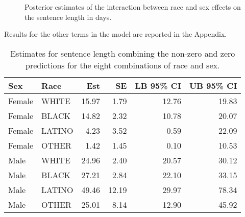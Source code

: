 \documentclass[
  letterpaper,
  DIV=11,
  numbers=noendperiod]{scrartcl}
\begin{document}
\begin{figure}

\begin{minipage}[t]{0.50\linewidth}

{\centering 


}

\end{minipage}%
%
\begin{minipage}[t]{0.50\linewidth}

{\centering 


}

\end{minipage}%

\caption{\label{fig-cond-eff-brm2-racesex}Posterior estimates of the
interaction between race and sex effects on the sentence length in
days.}

\end{figure}

Results for the other terms in the model are reported in the Appendix.

\hypertarget{tbl-race-sex-effects}{}
\begin{table}
\caption{\label{tbl-race-sex-effects}Estimates for sentence length combining the non-zero and zero
predictions for the eight combinations of race and sex. }\tabularnewline

\centering
\begin{tabular}{llrrrr}
\toprule
Sex & Race & Est & SE & LB 95\% CI & UB 95\% CI\\
\midrule
Female & WHITE & 15.97 & 1.79 & 12.76 & 19.83\\
Female & BLACK & 14.82 & 2.32 & 10.78 & 20.07\\
Female & LATINO & 4.23 & 3.52 & 0.59 & 22.09\\
Female & OTHER & 1.42 & 1.45 & 0.10 & 10.53\\
Male & WHITE & 24.96 & 2.40 & 20.57 & 30.12\\
\addlinespace
Male & BLACK & 27.21 & 2.84 & 22.10 & 33.15\\
Male & LATINO & 49.46 & 12.19 & 29.97 & 78.34\\
Male & OTHER & 25.01 & 8.14 & 12.90 & 45.92\\
\bottomrule
\end{tabular}
\end{table}
\end{document}

